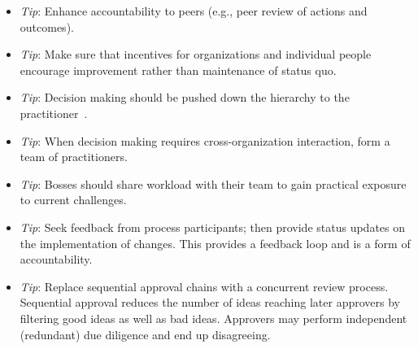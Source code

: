 \begin{itemize}
\item \textit{Tip}: Enhance accountability to peers (e.g., peer review of actions and outcomes).
\item \textit{Tip}: Make sure that incentives for organizations and individual people encourage improvement rather than maintenance of status quo.
\item \textit{Tip}: Decision making should be pushed down the hierarchy to the practitioner~\cite{2013_Marquet}.
\item \textit{Tip}: When decision making requires cross-organization interaction, form a team of practitioners.
\item \textit{Tip}: Bosses should share workload with their team to gain practical exposure to current challenges.
\item \textit{Tip}: Seek feedback from process participants; then provide status updates on the implementation of changes. This provides a feedback loop and is a form of accountability.

\item \textit{Tip}: Replace sequential approval chains with a concurrent review process. Sequential approval reduces the number of ideas reaching later approvers by filtering good ideas as well as bad ideas. Approvers may perform independent (redundant) due diligence and end up disagreeing. 
\end{itemize}
